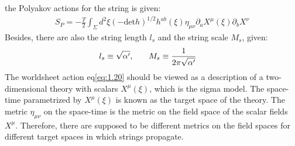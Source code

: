 the Polyakov actions for the string is given:
\begin{align}
    \label{eq:1.20}
    S_{P} = -\frac{T}{2} \int _{\Sigma} d^{2} \xi (-\text{det} h) ^{1/2} h^{ab} (\xi) \eta _{\mu \nu} \partial _{a} X^{\mu} (\xi) \partial _{b} X^{\nu} 
\end{align}
Besides, there are also the string length $l_{s}$ and the string scale $M_{s}$, given:
\begin{align}
    l_{s} \equiv \sqrt{\alpha '} , & \qq{} M_{s} \equiv \frac{1}{2\pi \sqrt{\alpha '}}
\end{align}
The worldsheet action eq\ref{eq:1.20} should be viewed as a description of a two-dimensional theory with scalars $X^{\mu} (\xi)$, which is the sigma model. The space-time parametrized by $X^{\mu} (\xi)$ is known as the target space of the theory. The metric $\eta _{\mu \nu}$ on the space-time is the metric on the field space of the scalar fields $X^{\mu}$. Therefore, there are supposed to be different metrics on the field spaces for different target spaces in which strings propagate.
